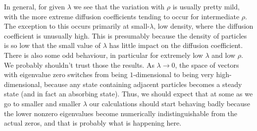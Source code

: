 In general, for given $\lambda$ we see that the variation with $\rho$ is usually pretty mild, with the more
extreme diffusion coefficients tending to occur for intermediate $\rho$. The exception to this occurs
primarily at small-$\lambda$, low density, where the diffusion 
coefficient is unusually high. This is presumably because the density
of particles is so low that the small value of $\lambda$ has little impact on the diffusion coefficient.
There is also some odd behaviour, in particular for extremely low $\lambda$ and low $\rho$. We probably
shouldn't trust those the results. As $\lambda \rightarrow 0$, the space of vectors with eigenvalue zero
switches from being $1$-dimensional to being very high-dimensional, because any state containing adjacent
particles becomes a steady state (and in fact an absorbing state). Thus, we should expect that at some
as we go to smaller and smaller $\lambda$ our calculations should start behaving badly because the lower
nonzero  eigenvalues become numerically indistinguishable from the actual zeros, and that is probably what
is happening here.

